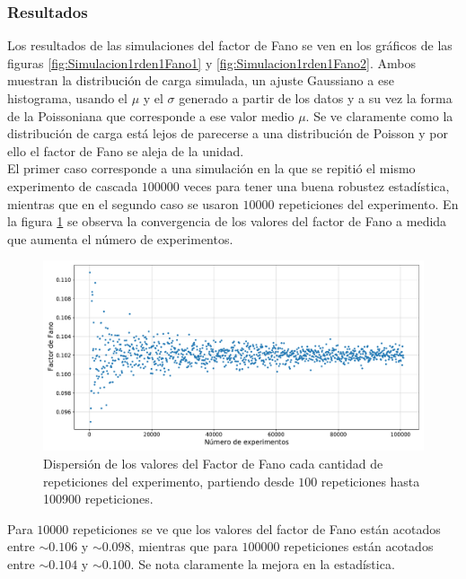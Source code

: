 \subsubsection*{Resultados}
\noindent Los resultados de las simulaciones del factor de Fano se ven en los gráficos de las figuras \ref{fig:Simulacion1rden1Fano1} y \ref{fig:Simulacion1rden1Fano2}. Ambos muestran la distribución de carga simulada, un ajuste Gaussiano a ese histograma, usando el $\mu$ y el $\sigma$ generado a partir de los datos y a su vez la forma de la Poissoniana que corresponde a ese valor medio $\mu$. Se ve claramente como la distribución de carga está lejos de parecerse a una distribución de Poisson y por ello el factor de Fano se aleja de la unidad.\\
\indent El primer caso corresponde a una simulación en la que se repitió el mismo experimento de cascada $100000$ veces para tener una buena robustez estadística, mientras que en el segundo caso se usaron $10000$ repeticiones del experimento. En la figura \ref{fig:FanoConvergencia} se observa la convergencia de los valores del factor de Fano a medida que aumenta el número de experimentos.
\begin{figure}[h]
    \centering
    \includegraphics[scale=0.5]{Figs/FanoConvergencia.pdf}
    \caption{\footnotesize{Dispersión de los valores del Factor de Fano cada cantidad de repeticiones del experimento, partiendo desde $100$ repeticiones hasta 100900 repeticiones.}}
    \label{fig:FanoConvergencia}
\end{figure}
Para $10000$ repeticiones se ve que los valores del factor de Fano están acotados entre $\sim 0.106$ y $\sim 0.098$, mientras que para $100000$ repeticiones están acotados entre $\sim 0.104$ y $\sim 0.100$. Se nota claramente la mejora en la estadística.\\
